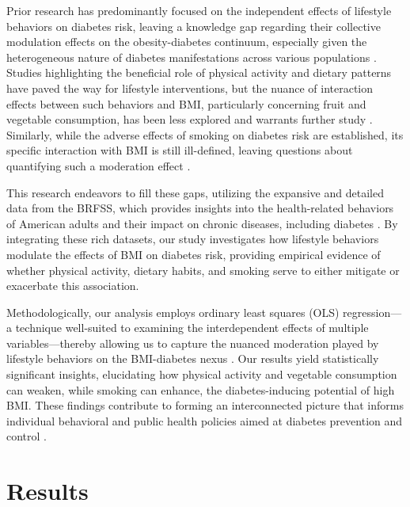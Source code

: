 \documentclass[11pt]{article}
\begin{document}
Prior research has predominantly focused on the independent effects of lifestyle behaviors on diabetes risk, leaving a knowledge gap regarding their collective modulation effects on the obesity-diabetes continuum, especially given the heterogeneous nature of diabetes manifestations across various populations \cite{Lv2017AdherenceTA, Schnurr2020ObesityUL, Bernab-Ortiz2015ContributionOM}. Studies highlighting the beneficial role of physical activity and dietary patterns have paved the way for lifestyle interventions, but the nuance of interaction effects between such behaviors and BMI, particularly concerning fruit and vegetable consumption, has been less explored and warrants further study \cite{Bohn2015ImpactOP, Han2020GeneticRA, Delgado-Velandia2022HealthyLM}. Similarly, while the adverse effects of smoking on diabetes risk are established, its specific interaction with BMI is still ill-defined, leaving questions about quantifying such a moderation effect \cite{Ng2019SmokingDD, Shi2013PhysicalAS}.

This research endeavors to fill these gaps, utilizing the expansive and detailed data from the BRFSS, which provides insights into the health-related behaviors of American adults and their impact on chronic diseases, including diabetes \cite{Matthews2017HealthRelatedBB, Iachan2016NationalWO, Tung2017RacialAE}. By integrating these rich datasets, our study investigates how lifestyle behaviors modulate the effects of BMI on diabetes risk, providing empirical evidence of whether physical activity, dietary habits, and smoking serve to either mitigate or exacerbate this association.

Methodologically, our analysis employs ordinary least squares (OLS) regression—a technique well-suited to examining the interdependent effects of multiple variables—thereby allowing us to capture the nuanced moderation played by lifestyle behaviors on the BMI-diabetes nexus \cite{Sambola2003RoleOR, Black2003DepressionPI, Rochlani2017MetabolicSP}. Our results yield statistically significant insights, elucidating how physical activity and vegetable consumption can weaken, while smoking can enhance, the diabetes-inducing potential of high BMI. These findings contribute to forming an interconnected picture that informs individual behavioral and public health policies aimed at diabetes prevention and control \cite{Reutrakul2013ChronotypeII, Stumvoll2000UseOT}.

\section*{Results}
\end{document}
